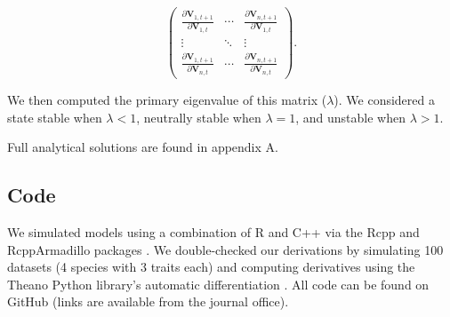\begin{equation} \label{eq:jacobian}
    \begin{pmatrix}
        \frac{\partial \mathbf{V}_{1,t+1}}{\partial \mathbf{V}_{1,t}} & \cdots &
            \frac{\partial \mathbf{V}_{n,t+1}}{\partial \mathbf{V}_{1,t}} \\
        \vdots & \ddots & \vdots \\
        \frac{\partial \mathbf{V}_{1,t+1}}{\partial \mathbf{V}_{n,t}} & \cdots &
            \frac{\partial \mathbf{V}_{n,t+1}}{\partial \mathbf{V}_{n,t}}
    \end{pmatrix}
    \textrm{.}
\end{equation}

\noindent We then computed the primary eigenvalue of this matrix ($\lambda$).
We considered a state stable when $\lambda < 1$,
neutrally stable when $\lambda = 1$,
and unstable when $\lambda > 1$.

Full analytical solutions are found in appendix A.


\subsection*{Code}

We simulated models using a combination of R \citep{RCoreTeam:2019wf} and
C++ via the Rcpp and RcppArmadillo packages
\citep{Eddelbuettel:2014ad,Eddelbuettel:2013if,Sanderson:2016cs}.
We double-checked our derivations by simulating 100 datasets
(4 species with 3 traits each) and computing derivatives using the Theano Python
library's automatic differentiation \citep{TheanoDevelopmentTeam:2016uc}.
All code can be found on GitHub
(links are available from the journal office).

